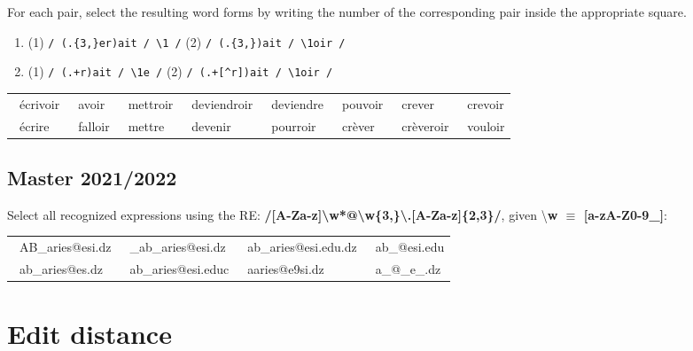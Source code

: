 \documentclass{../extra/aakpract/aakpract}
\begin{document}
	For each pair, select the resulting word forms by writing the number of the corresponding pair inside the appropriate square.
	
	\begin{enumerate}
		\item (1) \verb|/ (.{3,}er)ait / \1 /| (2) \verb|/ (.{3,})ait / \1oir /|
		\item (1) \verb|/ (.+r)ait / \1e /| (2) \verb|/ (.+[^r])ait / \1oir /|
	\end{enumerate}
	
	\begin{center}
		\begin{tabular}{|llllllll|}
			\hline
			\Square\ écrivoir & 
			\Square\ avoir & 
			\Square\ mettroir & 
			\Square\ deviendroir &
			\Square\ deviendre & 
			\Square\ pouvoir & 
			\Square\ crever & 
			\Square\ crevoir \\
			
			\Square\ écrire & 
			\Square\ falloir & 
			\Square\ mettre & 
			\Square\ devenir &
			\Square\ pourroir & 
			\Square\ crèver & 
			\Square\ crèveroir & 
			\Square\ vouloir \\
			\hline
		\end{tabular}
	\end{center}
	
	
	\subsection{Master 2021/2022}
	
	Select all recognized expressions using the RE: \textbf{/[A-Za-z]\textbackslash w*@\textbackslash w\{3,\}\textbackslash.[A-Za-z]\{2,3\}/}, given \textbackslash \textbf{w $\equiv$ [a-zA-Z0-9\_]}:
	\begin{center}
		\begin{tabular}{|llll|}
			\hline
			\Square\ AB\_aries@esi.dz & 
			\Square\ \_ab\_aries@esi.dz & 
			\Square\ ab\_aries@esi.edu.dz  & 
			\Square\ ab\_@esi.edu \\
			\Square\ ab\_aries@es.dz & 
			\Square\ ab\_aries@esi.educ &
			\Square\ aaries@e9si.dz & 
			\Square\ a\_@\_e\_.dz \\
			\hline
		\end{tabular}
	\end{center}
	
	\section{Edit distance}
	
\end{document}
